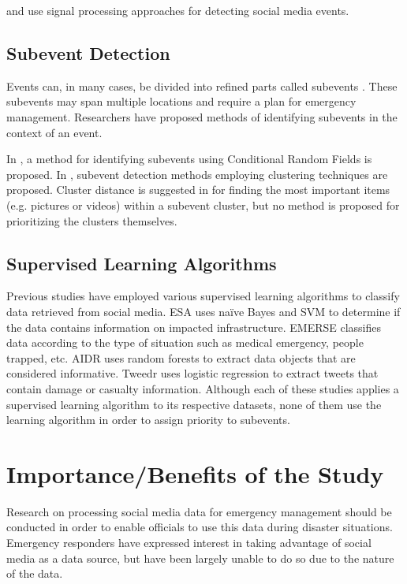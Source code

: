 \documentclass[conference]{IEEEtran}
\begin{document}
\cite{Weng} and \cite{Corley} use signal processing approaches for detecting social media events.
\subsection{Subevent Detection}
Events can, in many cases, be divided into refined parts called subevents \cite{Pohl}. These subevents may span multiple locations and require a plan for emergency management. Researchers have proposed methods of identifying subevents in the context of an event. 

In \cite{Khurdiya}, a method for identifying subevents using Conditional Random Fields is proposed. In \cite{Pohl,Hua}, subevent detection methods employing clustering techniques are proposed. Cluster distance is suggested in \cite{Pohl} for finding the most important items (e.g. pictures or videos) within a subevent cluster, but no method is proposed for prioritizing the clusters themselves.

\subsection{Supervised Learning Algorithms}
Previous studies have employed various supervised learning algorithms to classify data retrieved from social media. ESA \cite{yin}  uses naïve Bayes and SVM to determine if the data contains information on impacted infrastructure. EMERSE \cite{caragea} classifies data according to the type of situation such as medical emergency, people trapped, etc. AIDR \cite{Imran2014a} uses random forests to extract data objects that are considered informative. Tweedr \cite{ashktorab} uses logistic regression to extract tweets that contain damage or casualty information. Although each of these studies applies a supervised learning algorithm to its respective datasets, none of them use the learning algorithm in order to assign priority to subevents.

\section{Importance/Benefits of the Study}
Research on processing social media data for emergency management should be conducted in order to enable officials to use this data during disaster situations. Emergency responders have expressed interest in taking advantage of social media as a data source, but have been largely unable to do so due to the nature of the data.
\end{document}

